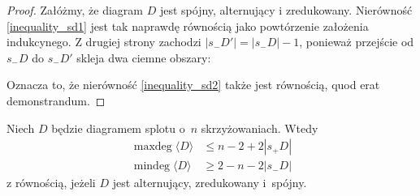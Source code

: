 \begin{proof}
    Załóżmy, że diagram $D$ jest spójny, alternujący i zredukowany.
    Nierówność \ref{inequality_sd1} jest tak naprawdę równością jako powtórzenie założenia indukcynego.
    Z drugiej strony zachodzi $|s_-D'|=|s_-D|-1$, ponieważ przejście od $s_-D$ do $s_-D'$ skleja dwa ciemne obszary:
\begin{comment}
    \[
        \begin{tikzpicture}[baseline=-0.65ex,scale=0.20]
        \begin{knot}[clip width=5]
            \strand[thick] (-5, 0) to (5, 0);
            \strand[thick] (0, -5) to (0, -1);
            \strand[thick] (0, 1) to (0, 5);
            \draw[fill=diagramfiller,draw=none] (-5, -5) rectangle (0, 0);
            \draw[fill=diagramfiller,draw=none] ( 5,  5) rectangle (0, 0);
            \node at (0, -8) {$D$};
        \end{knot}
        \end{tikzpicture}
        \quad
        \begin{tikzpicture}[baseline=-0.65ex,scale=0.20]
            \draw[fill=diagramfiller, draw=none] (-5, 0) -- (-2, 0) [in=up, out=right] to (0, -2) -- (0, -5) -- (-5, -5);
            \draw[fill=diagramfiller, draw=none] (5, 0) -- (2, 0) [in=down, out=left] to (0, 2) -- (0, 5) -- (5, 5);
            \draw[thick] (-5, 0) -- (-2, 0) [in=up, out=right] to (0, -2) -- (0, -5);
            \draw[thick] (5, 0) -- (2, 0) [in=down, out=left] to (0, 2) -- (0, 5);
            \node at (0, -8) {$s_-D$};
        \end{tikzpicture}
        \quad
        \begin{tikzpicture}[baseline=-0.65ex,scale=0.20]
            \draw[fill=diagramfiller, draw=none] (-5, -5) rectangle (5, 5);
            \draw[fill=white, draw=none] (5, 0) -- (2, 0) [in=up, out=left] to (0, -2) -- (0, -5) -- (5, -5);
            \draw[fill=white, draw=none] (-5, 0) -- (-2, 0) [in=down, out=right] to (0, 2) -- (0, 5) -- (-5, 5);
            \draw[thick] (5, 0) -- (2, 0) [in=up, out=left] to (0, -2) -- (0, -5);
            \draw[thick] (-5, 0) -- (-2, 0) [in=down, out=right] to (0, 2) -- (0, 5);
            \node at (0, -8) {$s_-D'$};
        \end{tikzpicture}
    \]
\end{comment}
    Oznacza to, że nierówność \ref{inequality_sd2} także jest równością, quod erat demonstrandum.
\end{proof}

 \begin{lemma}
    \label{lem:pretait_lemma_2}
    Niech $D$ będzie diagramem splotu o~$n$ skrzyżowaniach.
    Wtedy
    \begin{align}
        \operatorname{maxdeg} \langle D \rangle & \le n - 2 + 2|s_+D| \\
        \operatorname{mindeg} \langle D \rangle & \ge 2 - n - 2|s_-D|
    \end{align}
    z równością, jeżeli $D$ jest alternujący, zredukowany i~spójny.
\end{lemma}

